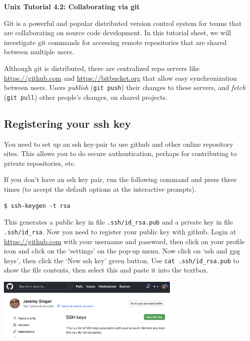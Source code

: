 \documentclass{article}
\begin{document}
\noindent
{\Large \textsf{\textbf{Unix Tutorial 4.2: Collaborating via git}}}

\bigskip

Git is a powerful and popular distributed version control system for teams that are collaborating on
source code development. In this tutorial sheet, we will
investigate git commands for accessing remote repositories that are
shared between multiple users.


Although git is distributed, there are centralized repo servers like \url{https://github.com} and \url{https://bitbucket.org} that
allow easy synchronization between users.
Users \emph{publish} (\texttt{git push}) their changes to these servers, and \emph{fetch} (\texttt{git pull})
other people's changes, on shared projects.

\subsection*{Registering your ssh key}

You need to set up an ssh key-pair to use github and other online repository
sites. This allows you to do secure authentication, perhaps for
contributing to private repositories, etc.

If you don't have an ssh key pair, run the following command and press
\keys{\enter} three times (to accept the default options at the interactive prompts).

\begin{lstlisting}[style=BashInputStyle]
    $ ssh-keygen -t rsa
\end{lstlisting}

This generates a public key in file \texttt{.ssh/id\_{}rsa.pub} and a private
key in file \texttt{.ssh/id\_{}rsa}. Now you need to register your public key with
github. Login at \url{https://github.com} with your username and password,
then click on your profile icon and click on the `settings' on the pop-up menu.
Now click on `ssh and gpg keys', then click the `New ssh key'  green button. Use \texttt{cat .ssh/id\_{}rsa.pub} to show the file contents, then select this and paste it into the textbox.

\begin{center}
\includegraphics[width=9cm]{github_key.png}
\end{center}
\end{document}
